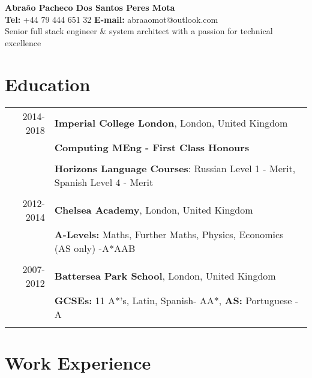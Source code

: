 \documentclass[a4paper,10pt]{article}
\begin{document}
	
	\begin{center}
		{\Large\bfseries Abra\~ao Pacheco Dos Santos Peres Mota} \\
		\vspace{2mm}
		{\textbf{Tel:} +44 79 444 651 32  } {\textbf{E-mail:} abraaomot@outlook.com } \\ \vspace{1mm}
	Senior full stack engineer \&  system architect with a passion for technical excellence
	\end{center}

	\section*{Education}

\begin{tabular}{rl}	
	2014-2018 & \textbf{Imperial College London}, London, United Kingdom \\& 
	\textbf{Computing MEng - First Class Honours} \\&\\& 
	\textbf{Horizons Language Courses}: Russian Level 1 - Merit, Spanish Level 4 - Merit
	\\\multicolumn{2}{c}{} \\
	2012-2014 & \textbf{Chelsea Academy}, London, United Kingdom \\&
	\textbf{A-Levels:}
	Maths, Further Maths, Physics, Economics (AS only) -A*AAB 
	\\\multicolumn{2}{c}{} \\
	2007-2012 & \textbf{Battersea Park School}, London, United Kingdom \\& 
	\textbf{GCSEs:} 11 A*'s, Latin, Spanish- AA*, \textbf{AS:} Portuguese - A
	\\\multicolumn{2}{c}{} \\
	
\end{tabular}

	
	\section*{Work Experience}
	
\end{document}
